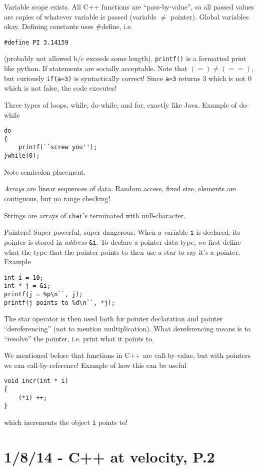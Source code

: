 \documentclass[10pt, twocolumn]{article}
\begin{document}
Variable scope exists. All C++ functions are ``pass-by-value'', so all passed values are copies of whatever variable is passed (variable $\neq$ pointer). Global variables okay. Defining constants uses \#define, i.e.
\begin{verbatim}
#define PI 3.14159
\end{verbatim}
(probably not allowed b/c exceeds some length). \texttt{printf()} is a formatted print like python. If statements are socially acceptable. Note that $(=) \neq (==)$, but curiously \texttt{if(a=3)} is syntactically correct! Since \texttt{a=3} returns 3 which is not 0 which is not false, the code executes! 

Three types of loops, while, do-while, and for, exactly like Java. Example of do-while
\begin{verbatim}
do
{
    printf(``screw you'');
}while(0);
\end{verbatim}
Note semicolon placement.

\emph{Arrays} are linear sequences of data. Random access, fixed size, elements are contiguous, but no range checking! 

Strings are arrays of \texttt{char}'s terminated with null-character.

Pointers! Super-powerful, super dangerous. When a variable \texttt{i} is declared, its pointer is stored in \emph{address} \texttt{\&i}. To declare a pointer data type, we first define what the type that the pointer points to then use a star to say it's a pointer. Example
\begin{verbatim}
int i = 10;
int * j = &i;
printf(j = %p\n``, j);
printf(j points to %d\n``, *j);
\end{verbatim}

The star operator is then used both for pointer declaration and pointer ``dereferencing'' (not to mention multiplication). What dereferencing means is to ``resolve'' the pointer, i.e. print what it points to.

We mentioned before that functions in C++ are call-by-value, but with pointers we can call-by-reference! Example of how this can be useful
\begin{verbatim}
void incr(int * i)
{
    (*i) ++;
}
\end{verbatim}
which increments the object \texttt{i} points to!

\section{1/8/14 - C++ at velocity, P.2}
\end{document}
